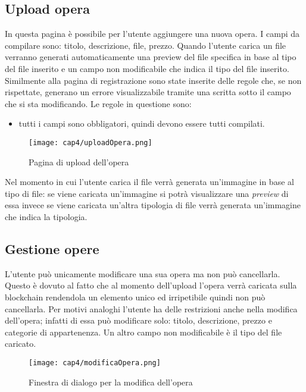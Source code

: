 \subsection{Upload opera}
In questa pagina è possibile per l'utente aggiungere una nuova opera. I campi da compilare sono: titolo, descrizione, file, prezzo. Quando l'utente carica un file verranno generati automaticamente una preview del file specifica in base al tipo del file inserito e un campo non modificabile che indica il tipo del file inserito. Similmente alla pagina di registrazione sono state inserite delle regole che, se non rispettate, generano un errore visualizzabile tramite una scritta sotto il campo che si sta modificando. Le regole in questione sono:
\begin{itemize}
	\item tutti i campi sono obbligatori, quindi devono essere tutti compilati.
\end{itemize}
\begin{figure}[H]
	\begin{center}
		\texttt{[image: cap4/uploadOpera.png]}
		\caption{Pagina di upload dell'opera}
	\end{center}
\end{figure}
Nel momento in cui l'utente carica il file verrà generata un'immagine in base al tipo di file: se viene caricata un'immagine si potrà visualizzare una \textit{preview} di essa invece se viene caricata un'altra tipologia di file verrà generata un'immagine che indica la tipologia.
\subsection{Gestione opere}
L'utente può unicamente modificare una sua opera ma non può cancellarla. Questo è dovuto al fatto che al momento dell'upload l'opera verrà caricata sulla blockchain rendendola un elemento unico ed irripetibile quindi non può cancellarla. Per motivi analoghi l'utente ha delle restrizioni anche nella modifica dell'opera; infatti di essa può modificare solo: titolo, descrizione, prezzo e categorie di appartenenza. Un altro campo non modificabile è il tipo del file caricato.
\begin{figure}[H]
	\begin{center}
		\texttt{[image: cap4/modificaOpera.png]}
		\caption{Finestra di dialogo per la modifica dell'opera}
	\end{center}
\end{figure}
